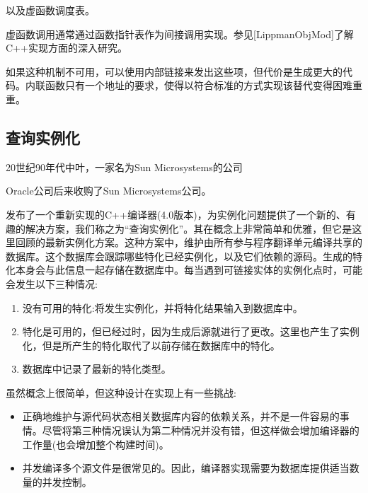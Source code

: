 以及虚函数调度表。

\begin{tcolorbox}[colback=webgreen!5!white,colframe=webgreen!75!black]
\hspace*{0.75cm}虚函数调用通常通过函数指针表作为间接调用实现。参见[LippmanObjMod]了解C++实现方面的深入研究。
\end{tcolorbox}

如果这种机制不可用，可以使用内部链接来发出这些项，但代价是生成更大的代码。内联函数只有一个地址的要求，使得以符合标准的方式实现该替代变得困难重重。

\subsection{查询实例化}

20世纪90年代中叶，一家名为Sun Microsystems的公司

\begin{tcolorbox}[colback=webgreen!5!white,colframe=webgreen!75!black]
\hspace*{0.75cm}Oracle公司后来收购了Sun Microsystems公司。
\end{tcolorbox}

发布了一个重新实现的C++编译器(4.0版本)，为实例化问题提供了一个新的、有趣的解决方案，我们称之为“查询实例化”。其在概念上非常简单和优雅，但它是这里回顾的最新实例化方案。这种方案中，维护由所有参与程序翻译单元编译共享的数据库。这个数据库会跟踪哪些特化已经实例化，以及它们依赖的源码。生成的特化本身会与此信息一起存储在数据库中。每当遇到可链接实体的实例化点时，可能会发生以下三种情况:

\begin{enumerate}
\item 
没有可用的特化:将发生实例化，并将特化结果输入到数据库中。

\item 
特化是可用的，但已经过时，因为生成后源就进行了更改。这里也产生了实例化，但是所产生的特化取代了以前存储在数据库中的特化。

\item 
数据库中记录了最新的特化类型。
\end{enumerate}

虽然概念上很简单，但这种设计在实现上有一些挑战:

\begin{itemize}
\item 
正确地维护与源代码状态相关数据库内容的依赖关系，并不是一件容易的事情。尽管将第三种情况误认为第二种情况并没有错，但这样做会增加编译器的工作量(也会增加整个构建时间)。

\item 
并发编译多个源文件是很常见的。因此，编译器实现需要为数据库提供适当数量的并发控制。
\end{itemize}

